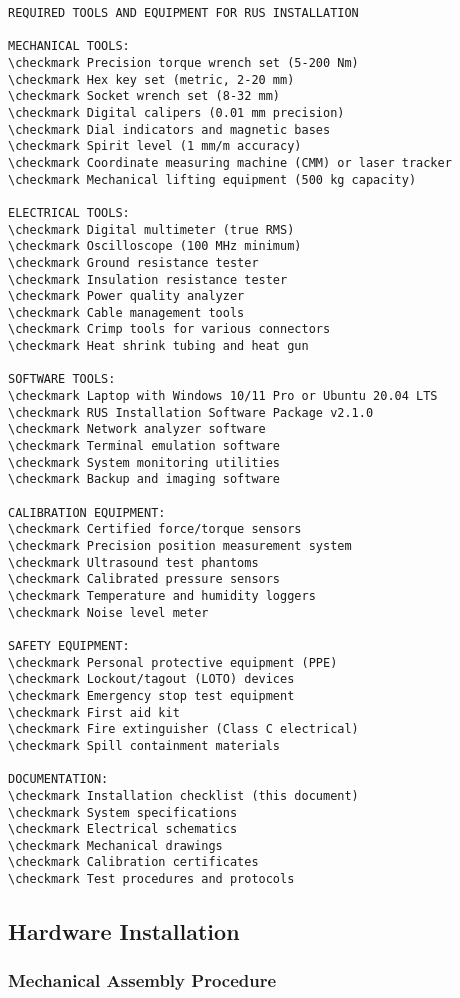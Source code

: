 \begin{lstlisting}[basicstyle=\ttfamily\footnotesize, caption={Installation Tool List}, label={lst:app-tools}]
REQUIRED TOOLS AND EQUIPMENT FOR RUS INSTALLATION

MECHANICAL TOOLS:
\checkmark Precision torque wrench set (5-200 Nm)
\checkmark Hex key set (metric, 2-20 mm)
\checkmark Socket wrench set (8-32 mm)
\checkmark Digital calipers (0.01 mm precision)
\checkmark Dial indicators and magnetic bases
\checkmark Spirit level (1 mm/m accuracy)
\checkmark Coordinate measuring machine (CMM) or laser tracker
\checkmark Mechanical lifting equipment (500 kg capacity)

ELECTRICAL TOOLS:
\checkmark Digital multimeter (true RMS)
\checkmark Oscilloscope (100 MHz minimum)
\checkmark Ground resistance tester
\checkmark Insulation resistance tester
\checkmark Power quality analyzer
\checkmark Cable management tools
\checkmark Crimp tools for various connectors
\checkmark Heat shrink tubing and heat gun

SOFTWARE TOOLS:
\checkmark Laptop with Windows 10/11 Pro or Ubuntu 20.04 LTS
\checkmark RUS Installation Software Package v2.1.0
\checkmark Network analyzer software
\checkmark Terminal emulation software
\checkmark System monitoring utilities
\checkmark Backup and imaging software

CALIBRATION EQUIPMENT:
\checkmark Certified force/torque sensors
\checkmark Precision position measurement system
\checkmark Ultrasound test phantoms
\checkmark Calibrated pressure sensors
\checkmark Temperature and humidity loggers
\checkmark Noise level meter

SAFETY EQUIPMENT:
\checkmark Personal protective equipment (PPE)
\checkmark Lockout/tagout (LOTO) devices
\checkmark Emergency stop test equipment
\checkmark First aid kit
\checkmark Fire extinguisher (Class C electrical)
\checkmark Spill containment materials

DOCUMENTATION:
\checkmark Installation checklist (this document)
\checkmark System specifications
\checkmark Electrical schematics
\checkmark Mechanical drawings
\checkmark Calibration certificates
\checkmark Test procedures and protocols
\end{lstlisting}

\subsection{Hardware Installation}

\subsubsection{Mechanical Assembly Procedure}

